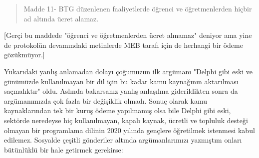 \documentclass[11pt]{article}
\begin{document}
\begin{quote}
Madde 11- BTG düzenlenen faaliyetlerde öğrenci ve öğretmenlerden hiçbir ad
altında ücret alamaz.
\end{quote}
[Gerçi bu maddede "öğrenci ve öğretmenlerden ücret alınamaz" deniyor ama yine
de protokolün devamındaki metinlerde MEB tarafı için de herhangi bir ödeme
gözükmüyor.]

Yukarıdaki yanlış anlamadan dolayı çoğumuzun ilk argümanı "Delphi gibi eski ve
günümüzde kullanılmayan bir dil için bu kadar kamu kaynağının aktarılması
saçmalıktır" oldu. Aslında bakarsanız yanlış anlaşılma giderildikten sonra da
argümanımızda çok fazla bir değişiklik olmadı. Sonuç olarak kamu kaynaklarından
tek bir kuruş ödeme yapılmamış olsa bile Delphi gibi eski, sektörde neredeyse
hiç kullanılmayan, kapalı kaynak, ücretli ve topluluk desteği olmayan bir
programlama dilinin 2020 yılında gençlere öğretilmek istenmesi kabul edilemez.
Sosyalde çeşitli gönderiler altında argümanlarımızı yazmıştım onları bütünlüklü
bir hale getirmek gerekirse:
\end{document}
